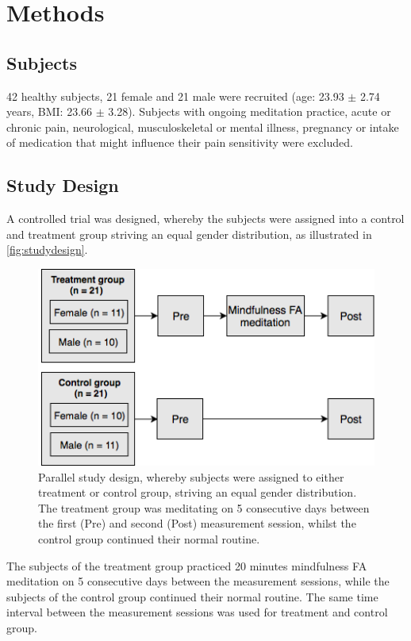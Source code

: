 \section{Methods}
\subsection{Subjects}
42 healthy subjects, 21 female and 21 male were recruited (age: 23.93 $\pm$ 2.74 years, BMI: 23.66 $\pm$ 3.28). Subjects with ongoing meditation practice, acute or chronic pain, neurological, musculoskeletal or mental illness, pregnancy or intake of medication that might influence their pain sensitivity were excluded.

\subsection{Study Design}
A controlled trial was designed, whereby the subjects were assigned into a control and treatment group striving an equal gender distribution, as illustrated in \autoref{fig:studydesign}.

\begin{figure}[H]
\centering
\includegraphics[width=1\columnwidth]{../figures/studydesign_aa.png}
\caption{Parallel study design, whereby subjects were assigned to either treatment or control group, striving an equal gender distribution. The treatment group was meditating on 5 consecutive days between the first (Pre) and second (Post) measurement session, whilst the control group continued their normal routine.}
\label{fig:studydesign}
\end{figure} 

The subjects of the treatment group practiced 20 minutes mindfulness FA meditation on 5 consecutive days between the measurement sessions, while the subjects of the control group continued their normal routine. The same time interval between the measurement sessions was used for treatment and control group.

